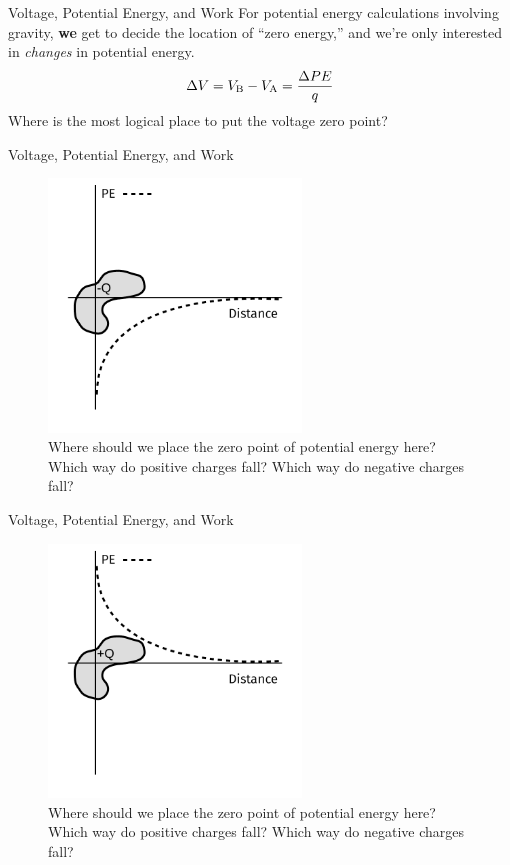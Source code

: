 \documentclass{beamer}
\begin{document}
\begin{frame}{Voltage, Potential Energy, and Work}
For potential energy calculations involving gravity, \textbf{we} get to decide the location of ``zero energy,'' and we're only interested in \textit{changes} in potential energy.
\begin{equation}
\Delta V = V_{\rm B} - V_{\rm A} = \frac{\Delta PE}{q}
\end{equation}
Where is the most logical place to put the voltage zero point?
\end{frame}

\begin{frame}{Voltage, Potential Energy, and Work}
\begin{figure}
\centering
\includegraphics[width=0.6\textwidth]{figures/PE.pdf}
\caption{\label{fig:PE} Where should we place the zero point of potential energy here?  Which way do positive charges fall?  Which way do negative charges fall?}
\end{figure}
\end{frame}

\begin{frame}{Voltage, Potential Energy, and Work}
\begin{figure}
\centering
\includegraphics[width=0.6\textwidth]{figures/PE2.pdf}
\caption{\label{fig:PE2} Where should we place the zero point of potential energy here?  Which way do positive charges fall?  Which way do negative charges fall?}
\end{figure}
\end{frame}
\end{document}
